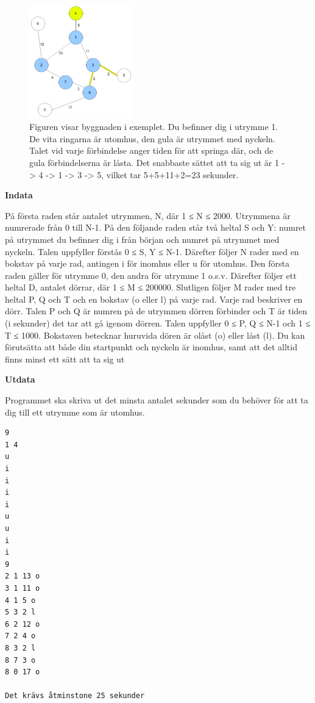 \documentclass[a4paper,12pt]{article}
\newcounter{iii}\setcounter{iii}{0}
\newcounter{pun}[iii]
\begin{document}
\begin{figure}[!ht]
\centering
\includegraphics[width=0.4\textwidth]{Brandlarm.png}
\caption{Figuren visar byggnaden i exemplet. Du befinner dig i utrymme 1. De vita ringarna är utomhus, den gula är utrymmet med nyckeln. Talet vid varje förbindelse anger tiden för att springa där, och de gula förbindelserna är låsta. Det snabbaste sättet att ta sig ut är 1 -> 4 -> 1 -> 3 -> 5, vilket tar 5+5+11+2=23 sekunder.  }
\label{fig:brand}
\end{figure}

\textbf{Indata}

På första raden står antalet utrymmen, N, där 1 ≤ N ≤ 2000. Utrymmena är numrerade från 0 till N-1. På den följande raden står två heltal S och Y: numret på utrymmet du befinner dig i från början och numret på utrymmet med nyckeln. Talen uppfyller förstås 0 ≤ S, Y ≤ N-1. Därefter följer N rader med en bokstav på varje rad, antingen i för inomhus eller u för utomhus. Den första raden gäller för utrymme 0, den andra för utrymme 1 o.s.v. Därefter följer ett heltal D, antalet dörrar, där 1 ≤ M ≤ 200000. Slutligen följer M rader med tre heltal P, Q och T och en bokstav (o eller l) på varje rad. Varje rad beskriver en dörr. Talen P och Q är numren på de utrymmen dörren förbinder och T är tiden (i sekunder) det tar att gå igenom dörren. Talen uppfyller 0 ≤ P, Q ≤ N-1 och 1 ≤ T ≤ 1000. Bokstaven betecknar huruvida dören är olåst (o) eller låst (l). Du kan förutsätta att både din startpunkt och nyckeln är inomhus, samt att det alltid finns minst ett sätt att ta sig ut 


\textbf{Utdata}

Programmet ska skriva ut det minsta antalet sekunder som du behöver för att ta dig till ett utrymme som är utomhus. 

\begin{lstlisting}
9
1 4
u
i
i
i
i
u
u
i
i
9
2 1 13 o
3 1 11 o
4 1 5 o
5 3 2 l
6 2 12 o
7 2 4 o
8 3 2 l
8 7 3 o
8 0 17 o

Det krävs åtminstone 25 sekunder
\end{lstlisting}
\end{document}
